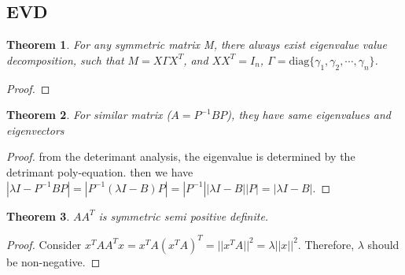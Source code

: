 \documentclass[12pt]{article}
\newtheorem{theorem}{Theorem}
\begin{document}
\subsection{EVD}
\begin{theorem}
	For any symmetric matrix M, there always exist eigenvalue value decomposition, such that $M=X\Gamma X^T$, and $XX^T=I_n$, $\Gamma=\text{diag}\{\gamma_1, \gamma_2,\cdots,\gamma_n\}$.
\end{theorem}
\begin{proof}
	
\end{proof}
\begin{theorem}
	For similar matrix ($A=P^{-1}BP$), they have same eigenvalues and eigenvectors
\end{theorem}
\begin{proof}
	from the deterimant analysis, the eigenvalue is determined by the detrimant poly-equation. then we have $|\lambda I - P^{-1}BP|=|P^{-1}(\lambda I-B)P|=|P^{-1}||\lambda I - B||P|=|\lambda I - B|.$
\end{proof}
\begin{theorem}
	$AA^T$ is symmetric semi positive definite.
\end{theorem}
\begin{proof}
	Consider $x^TAA^Tx=x^TA(x^TA)^T=||x^TA||^2=\lambda||x||^2.$ Therefore, $\lambda$ should be non-negative.
\end{proof}
\end{document}
